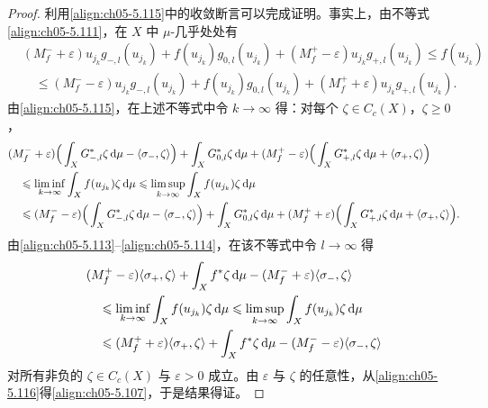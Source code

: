 \documentclass[../../main.tex]{subfiles}
\begin{document}
\begin{proof}
利用\eqref{align:ch05-5.115}中的收敛断言可以完成证明。事实上，由不等式\eqref{align:ch05-5.111}，在 $X$ 中 $\mu$-几乎处处有
\begin{align*}
&(M^-_f+\varepsilon)u_{j_k}g_{-,l}(u_{j_k})+f(u_{j_k})g_{0,l}(u_{j_k})+(M^+_f-\varepsilon)u_{j_k}g_{+,l}(u_{j_k})\leqslant f(u_{j_k})\\
&\quad\leqslant(M^-_f-\varepsilon)u_{j_k}g_{-,l}(u_{j_k})+f(u_{j_k})g_{0,l}(u_{j_k})+(M^+_f+\varepsilon)u_{j_k}g_{+,l}(u_{j_k}).
\end{align*}
由\eqref{align:ch05-5.115}，在上述不等式中令 $k\to\infty$ 得：对每个 $\zeta\in C_c(X)$，$\zeta\geqslant0$，
\begin{align}
&(M^-_f+\varepsilon)\Big(\int_XG^*_{-,l}\zeta\,\mathrm{d}\mu-\langle\sigma_-,\zeta\rangle\Big)+\int_XG^*_{0,l}\zeta\,\mathrm{d}\mu
+(M^+_f-\varepsilon)\Big(\int_XG^*_{+,l}\zeta\,\mathrm{d}\mu+\langle\sigma_+,\zeta\rangle\Big)\notag\\
&\quad\leqslant\liminf_{k\to\infty}\int_Xf(u_{j_k})\zeta\,\mathrm{d}\mu
\leqslant\limsup_{k\to\infty}\int_Xf(u_{j_k})\zeta\,\mathrm{d}\mu\notag\\
&\quad\leqslant(M^-_f-\varepsilon)\Big(\int_XG^*_{-,l}\zeta\,\mathrm{d}\mu-\langle\sigma_-,\zeta\rangle\Big)+\int_XG^*_{0,l}\zeta\,\mathrm{d}\mu
+(M^+_f+\varepsilon)\Big(\int_XG^*_{+,l}\zeta\,\mathrm{d}\mu+\langle\sigma_+,\zeta\rangle\Big).\notag
\end{align}
由\eqref{align:ch05-5.113}--\eqref{align:ch05-5.114}，在该不等式中令 $l\to\infty$ 得
\begin{align}
&(M^+_f-\varepsilon)\langle\sigma_+,\zeta\rangle+\int_Xf^*\zeta\,\mathrm{d}\mu-(M^-_f+\varepsilon)\langle\sigma_-,\zeta\rangle\notag\\
&\quad\leqslant\liminf_{k\to\infty}\int_Xf(u_{j_k})\zeta\,\mathrm{d}\mu
\leqslant\limsup_{k\to\infty}\int_Xf(u_{j_k})\zeta\,\mathrm{d}\mu\notag\\
&\quad\leqslant(M^+_f+\varepsilon)\langle\sigma_+,\zeta\rangle+\int_Xf^*\zeta\,\mathrm{d}\mu-(M^-_f-\varepsilon)\langle\sigma_-,\zeta\rangle\label{align:ch05-5.116}
\end{align}
对所有非负的 $\zeta\in C_c(X)$ 与 $\varepsilon>0$ 成立。由 $\varepsilon$ 与 $\zeta$ 的任意性，从\eqref{align:ch05-5.116}得\eqref{align:ch05-5.107}，于是结果得证。


\end{proof}
\end{document}
